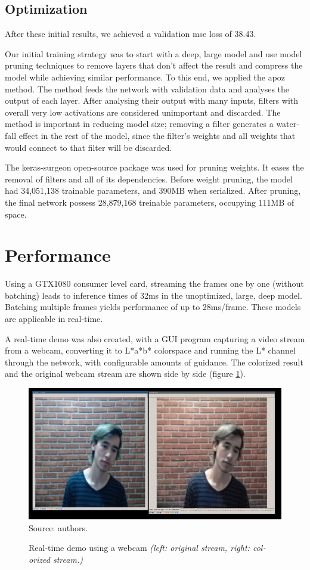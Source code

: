 \documentclass[12pt,openright,oneside,a4paper,english, brazilian]{abntex2}
\begin{document}
\begin{otherlanguage}{english}
\subsection{Optimization}
After these initial results, we achieved a validation \acrshort{mse} loss of 38.43.

Our initial training strategy was to start with a deep, large model and use model pruning techniques to remove layers that don't affect the result and compress the model while achieving similar performance. To this end, we applied the \acrfull{apoz} method. The method feeds the network with validation data and analyses the output of each layer. After analysing their output with many inputs, filters with overall very low activations are considered unimportant and discarded. The method is important in reducing model size; removing a filter generates a waterfall effect in the rest of the model, since the filter's weights and all weights that would connect to that filter will be discarded.

The keras-surgeon \cite{keras_surgeon} open-source package was used for pruning weights. It eases the removal of filters and all of its dependencies. Before weight pruning, the model had 34,051,138 trainable parameters, and 390MB when serialized. After pruning, the final network possess 28,879,168 treinable parameters, occupying 111MB of space.

\section{Performance}
Using a GTX1080 consumer level card, streaming the frames one by one (without batching) leads to inference times of 32ms in the unoptimized, large, deep model. Batching multiple frames yields performance of up to 28ms/frame. These models are applicable in real-time.

A real-time demo was also created, with a GUI program capturing a video stream from a webcam, converting it to L*a*b* colorspace and running the L* channel through the network, with configurable amounts of guidance. The colorized result and the original webcam stream are shown side by side (figure \ref{fig:webcam}).

\begin{figure}[H]
\centering
\caption{Real-time demo using a webcam \textit{(left: original stream, right: colorized stream.)}}
\includegraphics[width=\textwidth+20pt]{webcam}
Source: authors.
\label{fig:webcam}
\end{figure}


\end{otherlanguage}
\end{document}
